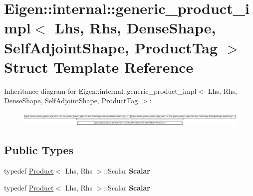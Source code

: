\hypertarget{struct_eigen_1_1internal_1_1generic__product__impl_3_01_lhs_00_01_rhs_00_01_dense_shape_00_01_se2e8cb7106d8225767d620f93988c2a09}{}\section{Eigen\+:\+:internal\+:\+:generic\+\_\+product\+\_\+impl$<$ Lhs, Rhs, Dense\+Shape, Self\+Adjoint\+Shape, Product\+Tag $>$ Struct Template Reference}
\label{struct_eigen_1_1internal_1_1generic__product__impl_3_01_lhs_00_01_rhs_00_01_dense_shape_00_01_se2e8cb7106d8225767d620f93988c2a09}
Inheritance diagram for Eigen\+:\+:internal\+:\+:generic\+\_\+product\+\_\+impl$<$ Lhs, Rhs, Dense\+Shape, Self\+Adjoint\+Shape, Product\+Tag $>$\+:\begin{figure}[H]
\begin{center}
\leavevmode
\includegraphics[height=0.698254cm]{struct_eigen_1_1internal_1_1generic__product__impl_3_01_lhs_00_01_rhs_00_01_dense_shape_00_01_se2e8cb7106d8225767d620f93988c2a09}
\end{center}
\end{figure}
\subsection*{Public Types}
\begin{DoxyCompactItemize}
\item 
\mbox{\label{struct_eigen_1_1internal_1_1generic__product__impl_3_01_lhs_00_01_rhs_00_01_dense_shape_00_01_se2e8cb7106d8225767d620f93988c2a09_a3a770e8996c89609d625320435ab4ade}} 
typedef \hyperlink{group___core___module_class_eigen_1_1_product}{Product}$<$ Lhs, Rhs $>$\+::Scalar {\bfseries Scalar}
\item 
\mbox{\label{struct_eigen_1_1internal_1_1generic__product__impl_3_01_lhs_00_01_rhs_00_01_dense_shape_00_01_se2e8cb7106d8225767d620f93988c2a09_a3a770e8996c89609d625320435ab4ade}} 
typedef \hyperlink{group___core___module_class_eigen_1_1_product}{Product}$<$ Lhs, Rhs $>$\+::Scalar {\bfseries Scalar}
\end{DoxyCompactItemize}

